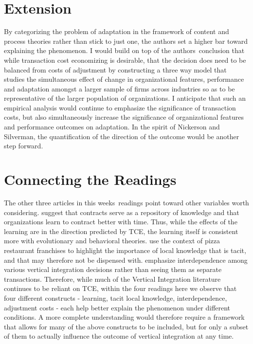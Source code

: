 \documentclass[12pt]{article}
\begin{document}
\section{Extension}\label{S:Extension}
By categorizing the problem of adaptation in the framework of content and process theories rather than stick to just one, the authors set a higher bar toward explaining the phenomenon. I would build on top of the authors\textquotesingle\  conclusion that while transaction cost economizing is desirable, that the decision does need to be balanced from costs of adjustment by constructing a three way model that studies the simultaneous effect of change in organizational features, performance and adaptation amongst a larger sample of firms across industries so as to be representative of the larger population of organizations.  I anticipate that such an empirical analysis would continue to emphasize the significance of transaction costs, but also simultaneously increase the significance of organizational features and performance outcomes on adaptation. In the spirit of Nickerson and Silverman, the quantification of the direction of the outcome would be another step forward.

\section{Connecting the Readings}\label{S:Conclusion}
The other three articles in this weeks\textquotesingle\ readings point toward other variables worth considering. \cite{Mayer2004} suggest that contracts serve as a repository of knowledge and that organizations learn to contract better with time. Thus, while the effects of the learning are in the direction predicted by TCE, the learning itself is consistent more with evolutionary and behavioral theories. \cite{Kalnins2004} use the context of pizza restaurant franchises to highlight the importance of local knowledge that is tacit, and that may therefore not be dispensed with. \cite{Novak2009} emphasize interdependence among various vertical integration decisions rather than seeing them as separate transactions. Therefore, while much of the Vertical Integration literature continues to be reliant on TCE, within the four readings here we observe that four different constructs - learning, tacit local knowledge, interdependence, adjustment costs - each help better explain the phenomenon under different conditions. A more complete understanding would therefore require a framework that allows for many of the above constructs to be included, but for only a subset of them to actually influence the outcome of vertical integration at any time.

 

\end{document}
